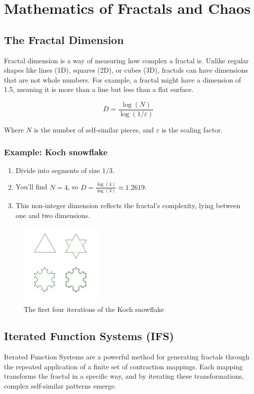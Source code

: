 \documentclass[12pt]{article}
\begin{document}
\newpage

\section{Mathematics of Fractals and Chaos}


\subsection{The Fractal Dimension}
Fractal dimension is a way of measuring how complex a fractal is. Unlike regular shapes like lines (1D), squares (2D), or cubes (3D), fractals can have dimensions that are not whole numbers. For example, a fractal might have a dimension of 1.5, meaning it is more than a line but less than a flat surface. 

\[
D = \frac{\log(N)}{\log(1/\varepsilon)}
\]

Where \( N \) is the number of self-similar pieces, and \( \varepsilon \) is the scaling factor.

\subsubsection{Example: Koch snowflake}
	\begin{enumerate}
		\item Divide into segments of size \(1/3\).
		\item You’ll find \(N = 4\), so \(D = \frac{\log(4)}{\log(3)} \approx 1.2619\).
		\item This non-integer dimension reflects the fractal's complexity, lying between one and two dimensions.
	\end{enumerate}
\begin{figure}[H] \centering \includegraphics[width=0.36\textwidth]{assets/KochFlake.png} \caption{The first four iterations of the Koch snowflake} \label{fig:example} \end{figure}

\subsection{Iterated Function Systems (IFS)}
Iterated Function Systems are a powerful method for generating fractals through the repeated application of a finite set of contraction mappings. Each mapping transforms the fractal in a specific way, and by iterating these transformations, complex self-similar patterns emerge.
\end{document}
